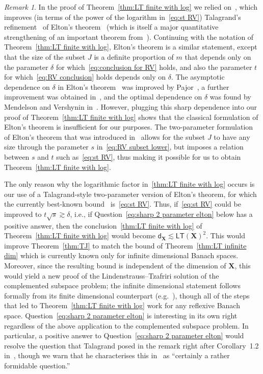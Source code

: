 \documentclass[11pt,reqno]{amsart}
\renewcommand{\d}{\delta}
\newcommand{\dd}{\mathsf{d}}
\newcommand{\X}{\mathbf X}
\theoremstyle{remark}
\newtheorem{remark}[theorem]{Remark}
\renewcommand{\1}{\mathbf 1}
\newcommand{\LT}{\mathsf{LT}}
\begin{document}
\begin{remark}\label{rem:Elton} In the  proof of Theorem~\ref{thm:LT finite with log} we relied on~\cite[Theorem~7.4]{RV06}, which improves (in terms  of the power of the logarithm in~\eqref{eq:st RV}) Talagrand's refinement~\cite{Tal-elton92} of Elton's theorem~\cite{Elt83} (which is itself a major quantitative strengthening of an important theorem from~\cite{Pis73}). Continuing with the notation of Theorem~\ref{thm:LT finite with log}, Elton's theorem is a similar statement, except that the size of the subset $J$ is a definite proportion of $m$ that depends only on the parameter  $\d$ for which~\eqref{eq:conclusion for RV} holds, and also the parameter $t$ for which~\eqref{eq:RV conclusion} holds depends only on $\d$. The asymptotic dependence on $\d$ in Elton's theorem~\cite{Elt83} was improved by Pajor~\cite{Paj83}, a further improvement was obtained in~\cite{Tal-elton92}, and the optimal dependence on $\d$ was found by Mendelson and Vershynin in~\cite{MV03}. However, plugging this sharp dependence into our proof of Theorem~\ref{thm:LT finite with log} shows that the classical formulation of Elton's theorem is insufficient for our purposes. The two-parameter formulation of Elton's theorem that was introduced in~\cite{Tal-elton92} allows for the subset $J$ to have any size through the parameter $s$ in~\eqref{eq:RV subset lower}, but imposes a relation between $s$ and $t$ such as~\eqref{eq:st RV}, thus making it possible for us to obtain Theorem~\ref{thm:LT finite with log}.

The only reason why the logarithmic factor in~\eqref{thm:LT finite with log} occurs is our use of a Talagrand-style  two-parameter version of Elton's theorem, for which the currently best-known bound~\cite{RV06} is~\eqref{eq:st RV}. Thus, if~\eqref{eq:st RV} could be improved to $t\sqrt{s}\gtrsim \d$, i.e., if Question~\ref{eq:sharp 2 parameter elton} below has a positive answer, then  the conclusion~\eqref{thm:LT finite with log} of Theorem~\ref{thm:LT finite with log}  would become $\dd_{\X}\lesssim \LT(\X)^2$. This  would improve Theorem~\ref{thm:TJ} to match the  bound of Theorem~\ref{thm:LT infinite dim} which is currently known only for infinite dimensional Banach spaces. Moreover, since the resulting bound is independent of the dimension of $\X$, this would yield a new proof of the Lindenstrauss--Tzafriri solution of the complemented subspace problem; the infinite dimensional statement follows formally from its finite dimensional counterpart (e.g.~\cite[Theorem~12.1.6]{AK06}), though all of the steps that led to Theorem~\ref{thm:LT finite with log} work for any reflexive Banach space. Question~\ref{eq:sharp 2 parameter elton} is interesting in its own right regardless of the above application to the complemented subspace problem. In particular, a positive answer to Question~\ref{eq:sharp 2 parameter elton} would resolve the question that Talagrand posed in the remark right after Corollary~1.2 in~\cite{Tal-elton92}, though we warn that he characterises this in~\cite{Tal-elton92} as ``certainly a rather formidable question.''



\end{remark}
\end{document}
